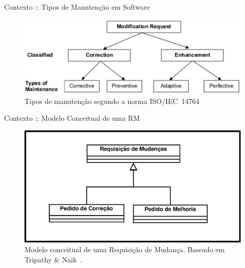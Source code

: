 \documentclass[t,14pt,mathserif]{beamer}
\begin{document}
\begin{frame}{Contexto :: Tipos de Manutenção em Software}

    \begin{figure}[hbtp]
        \centering
        \includegraphics[width=.75\textwidth]{../img/modification_request.eps}
        \caption{Tipos de manutenção segundo a norma
                 ISO/IEC~14764~\cite{1703974}}
\label{fig:modification-request}
    \end{figure}

\end{frame}

\begin{frame}{Contexto :: Modelo Conceitual de uma RM}
        \begin{figure}[htpb]
            \centering
            \includegraphics[width=0.75\linewidth]{../img/diagrama-classe-conceitual-requisicao-mudancas.pdf}
                \caption{Modelo conceitual de uma Requisição de Mudança.
                         Baseado em Tripathy \&
                         Naik~\cite{tripathy2014software}.}
\label{fig:diagrama-classe-requisicao-mudancas}
        \end{figure}
\end{frame}
\end{document}
